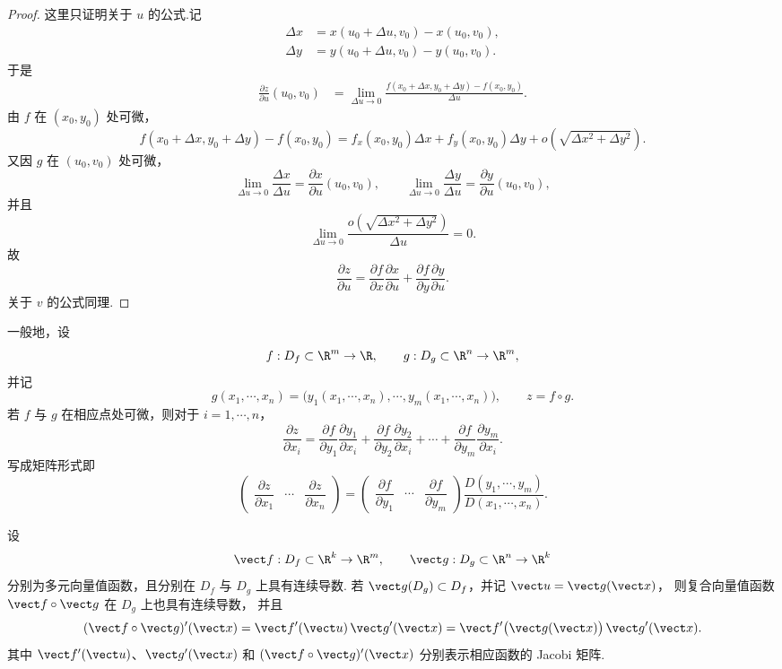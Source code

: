 \begin{proof}
	这里只证明关于 $u$ 的公式.记
	\[
	\begin{aligned}
	\Delta x&=x(u_0+\Delta u,v_0)-x(u_0,v_0),\\
	\Delta y&=y(u_0+\Delta u,v_0)-y(u_0,v_0).
	\end{aligned}
	\]
	于是
	\[
	\begin{aligned}
	\frac{\partial z}{\partial u}(u_0,v_0)
	&=
	\lim_{\Delta u\to0}
	\frac{
	f(x_0+\Delta x,y_0+\Delta y)-f(x_0,y_0)}
	{\Delta u}.
	\end{aligned}
	\]
	由 $f$ 在 $(x_0,y_0)$ 处可微，
	\[
	f(x_0+\Delta x,y_0+\Delta y)-f(x_0,y_0)
	=
	f_x(x_0,y_0)\Delta x
	+
	f_y(x_0,y_0)\Delta y
	+
	o\left(\sqrt{\Delta x^2+\Delta y^2}\right).
	\]
	又因 $g$ 在 $(u_0,v_0)$ 处可微，
	\[
	\lim_{\Delta u\to0}\frac{\Delta x}{\Delta u}
	=
	\frac{\partial x}{\partial u}(u_0,v_0),
	\qquad
	\lim_{\Delta u\to0}\frac{\Delta y}{\Delta u}
	=
	\frac{\partial y}{\partial u}(u_0,v_0),
	\]
	并且
	\[
	\lim_{\Delta u\to0}
	\frac{o\left(\sqrt{\Delta x^2+\Delta y^2}\right)}
	{\Delta u}=0.
	\]
	故
	\[
	\frac{\partial z}{\partial u}
	=
	\frac{\partial f}{\partial x}\frac{\partial x}{\partial u}
	+
	\frac{\partial f}{\partial y}\frac{\partial y}{\partial u}.
	\]
	关于 $v$ 的公式同理.
\end{proof}

一般地，设
\[
f:D_f\subset\R^m\to\R,
\qquad
g:D_g\subset\R^n\to\R^m,
\]
并记
\[
g(x_1,\cdots,x_n)
=
\bigl(y_1(x_1,\cdots,x_n),\cdots,y_m(x_1,\cdots,x_n)\bigr),
\qquad
z=f\circ g.
\]
若 $f$ 与 $g$ 在相应点处可微，则对于 $i=1,\cdots,n$，
\[
\frac{\partial z}{\partial x_i}
=
\frac{\partial f}{\partial y_1}\frac{\partial y_1}{\partial x_i}
+
\frac{\partial f}{\partial y_2}\frac{\partial y_2}{\partial x_i}
+\cdots+
\frac{\partial f}{\partial y_m}\frac{\partial y_m}{\partial x_i}.
\]
写成矩阵形式即
\[
\begin{pmatrix}
\dfrac{\partial z}{\partial x_1}
&\cdots&
\dfrac{\partial z}{\partial x_n}
\end{pmatrix}
=
\begin{pmatrix}
\dfrac{\partial f}{\partial y_1}
&\cdots&
\dfrac{\partial f}{\partial y_m}
\end{pmatrix}
\frac{D(y_1,\cdots,y_m)}
{D(x_1,\cdots,x_n)}.
\]

\begin{theorem}[向量值复合函数的链式法则]
	设
	\[
	\vect f:D_f\subset\R^k\to\R^m,
	\qquad
	\vect g:D_g\subset\R^n\to\R^k
	\]
	分别为多元向量值函数，且分别在 $D_f$ 与 $D_g$ 上具有连续导数.
	若 $\vect g(D_g)\subset D_f$，并记 $\vect u=\vect g(\vect x)$，
	则复合向量值函数 $\vect f\circ\vect g$ 在 $D_g$ 上也具有连续导数，
	并且
	\[
	(\vect f\circ\vect g)'(\vect x)
	=
	\vect f'(\vect u)\,\vect g'(\vect x)
	=
	\vect f'\bigl(\vect g(\vect x)\bigr)\,\vect g'(\vect x).
	\]
	其中 $\vect f'(\vect u)$、$\vect g'(\vect x)$ 和
	$(\vect f\circ\vect g)'(\vect x)$ 分别表示相应函数的 Jacobi 矩阵.
\end{theorem}

